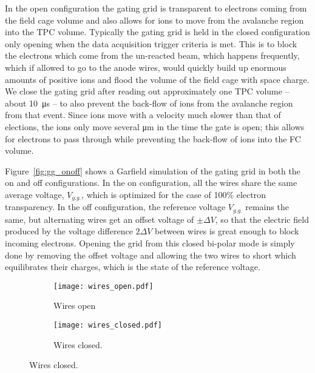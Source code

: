 In the open configuration the gating grid is transparent to electrons coming from the field cage volume and also allows for ions to move from the avalanche region into the TPC volume. Typically the gating grid is held in the closed configuration only opening when the data acquisition trigger criteria is met. This is to block the electrons which come from the un-reacted beam, which happens frequently, which if allowed to go to the anode wires, would quickly build up enormous amounts of positive ions and flood the volume of the field cage with space charge. We close the gating grid after reading out approximately one TPC volume -- about \SI{10}{\micro\second}  -- to also prevent the back-flow of ions from the avalanche region from that event. Since ions move with a velocity much slower than that of elections, the ions only move several \si{\micro\metre} in the time the gate is open; this allows for electrons to pass through while preventing the back-flow of ions into the FC volume. 

Figure~\ref{fig:gg_onoff} shows a Garfield simulation of the gating grid in both the on and off configurations. In the on configuration, all the wires share the same average voltage, $V_{g.g.}$, which is optimized for the case of 100\% electron transparency. In the off configuration, the reference voltage $V_{g.g.}$ remains the same, but alternating wires get an offset voltage of $\pm \Delta V$, so that the electric field produced by the voltage difference $2\Delta V$ between wires is great enough to block incoming electrons. Opening the grid from this closed bi-polar mode is simply done by removing the offset voltage and allowing the two wires to short which equilibrates their charges, which is the state of the reference voltage. 

\begin{figure}[!htb]
    \centering
    \begin{subfigure}[t]{0.49\textwidth}
        \centering
        \texttt{[image: wires\_open.pdf]} 
        \caption{Wires open} \label{fig:wires_open}
    \end{subfigure}
    \hfill
    \begin{subfigure}[t]{0.42\textwidth}
        \centering
        \texttt{[image: wires\_closed.pdf]} 
        \caption{Wires closed.} \label{fig:wires_closed}
    \end{subfigure}
\label{fig:wires}
\end{figure}



